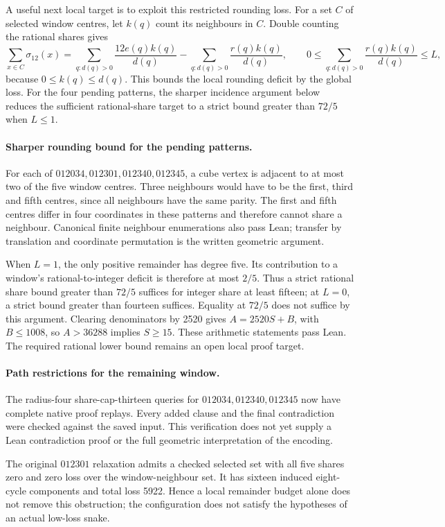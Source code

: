 \documentclass[11pt,a4paper]{article}
\theoremstyle{definition}
\theoremstyle{remark}
\begin{document}
A useful next local target is to exploit this restricted rounding loss.
For a set $C$ of selected window centres, let $k(q)$ count its neighbours
in $C$. Double counting the rational shares gives
\[
\sum_{x\in C}\sigma_{12}(x)
=\sum_{q:d(q)>0}\frac{12e(q)k(q)}{d(q)}
-\sum_{q:d(q)>0}\frac{r(q)k(q)}{d(q)},
\qquad
0\le\sum_{q:d(q)>0}\frac{r(q)k(q)}{d(q)}\le L,
\]
because $0\le k(q)\le d(q)$. This bounds the local rounding deficit
by the global loss. For the four pending patterns, the sharper
incidence argument below reduces the sufficient rational-share
target to a strict bound greater than $72/5$ when $L\le1$.

\paragraph{Sharper rounding bound for the pending patterns.}
For each of $012034,012301,012340,012345$, a cube vertex is adjacent to
at most two of the five window centres. Three neighbours would have to
be the first, third and fifth centres, since all neighbours have the same
parity. The first and fifth centres differ in four coordinates in these
patterns and therefore cannot share a neighbour. Canonical finite
neighbour enumerations also pass Lean; transfer by translation and
coordinate permutation is the written geometric argument.

When $L=1$, the only positive remainder has degree five. Its contribution
to a window's rational-to-integer deficit is therefore at most $2/5$.
Thus a strict rational share bound greater than $72/5$ suffices for
integer share at least fifteen; at $L=0$, a strict bound greater than
fourteen suffices. Equality at $72/5$ does not suffice by this argument.
Clearing denominators by 2520 gives $A=2520S+B$, with $B\le1008$,
so $A>36288$ implies $S\ge15$. These arithmetic statements pass Lean.
The required rational lower bound remains an open local proof target.

\paragraph{Path restrictions for the remaining window.}
The radius-four share-cap-thirteen queries for $012034,012340,012345$
now have complete native proof replays. Every added clause and the final
contradiction were checked against the saved input. This verification
does not yet supply a Lean contradiction proof or the full geometric
interpretation of the encoding.

The original $012301$ relaxation admits a checked selected set with all
five shares zero and zero loss over the window-neighbour set. It has
sixteen induced eight-cycle components and total loss 5922. Hence a
local remainder budget alone does not remove this obstruction; the
configuration does not satisfy the hypotheses of an actual low-loss snake.
\end{document}
